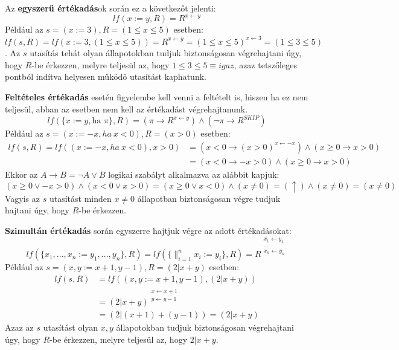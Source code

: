 \documentclass[12pt]{article}
\begin{document}
Az \textbf{egyszerű értékadás}ok során ez a következőt jelenti:
$$lf(x := y, R) = R^{x \leftarrow y } $$
Például az $s = (x := 3), R = (1 \le x \le 5)$ esetben:\\
$lf(s, R) = lf(x:=3, (1 \le x \le 5)) = R^{x \leftarrow y} = (1 \le x \le 5)^{x \leftarrow 3} = (1 \le 3 \le 5)$.
Az $s$ utasítás tehát olyan állapotokban tudjuk biztonságosan végrehajtani úgy, hogy $R$-be érkezzen, melyre teljesül az, hogy $1 \le 3 \le 5 \equiv igaz$, azaz tetszőleges pontból indítva helyesen működő utasítást kaphatunk.

\textbf{Feltételes értékadás} esetén figyelembe kell venni a feltételt is, hiszen ha ez nem teljesül, abban az esetben nem kell az értékadást végrehajtanunk.
$$lf(\{x:=y, \text{ha } \pi\}, R) = (\pi \rightarrow R^{x \leftarrow y}) \land (\neg \pi \rightarrow R^{SKIP})$$
Például az $s = (x := -x, ha\ x < 0), R = (x > 0)$ esetben:
\begin{align*}
	lf(s, R) = lf((x := -x, ha\ x < 0), x > 0) &= (x < 0 \rightarrow (x > 0)^{x \leftarrow -x}) \land (x \ge 0 \rightarrow x > 0)\\
	&= (x < 0 \rightarrow -x > 0) \land (x \ge 0 \rightarrow x > 0)
\end{align*}
Ekkor az $A \rightarrow B = \neg A \lor B$ logikai szabályt alkalmazva az alábbit kapjuk:
$$ (x \ge 0 \lor -x > 0) \land (x < 0 \lor x > 0) = (x \ge 0 \lor x < 0) \land (x \neq 0) = (\uparrow) \land (x \neq 0) = (x \neq 0)$$
Vagyis az $s$ utasítást minden $x \neq 0$ állapotban biztonságosan végre tudjuk hajtani úgy, hogy $R$-be érkezzen.

\textbf{Szimultán értékadás} során egyszerre hajtjuk végre az adott értékadásokat:
$$lf(\{x_1, ..., x_n := y_1, ..., y_n\}, R) = lf(\{ \mathop{\parallel}_{i=1}^{n} x_i := y_i \}, R) = R^{\substack{ x_1 \leftarrow y_1 \\ ... \\ x_n \leftarrow y_n }}$$
Például az $s = (x,y := x + 1, y - 1), R = (2 | x + y)$ esetben:
\begin{align*}
	lf(s, R) &= lf((x,y := x + 1, y - 1), (2 | x + y)) \\
		&= (2 | x + y)^{\substack{ x \leftarrow x + 1 \\ y \leftarrow y - 1 }} \\
		&= (2 | (x + 1) + (y - 1)) = (2 | x + y)
\end{align*}
Azaz az $s$ utasítást olyan $x, y$ állapotokban tudjuk biztonságosan végrehajtani úgy, hogy $R$-be érkezzen, melyre teljesül az, hogy $2 | x + y$.
\end{document}
